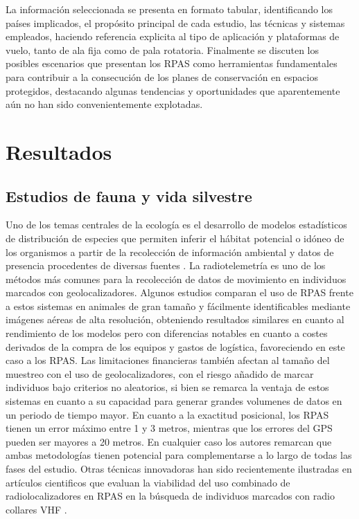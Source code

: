 \documentclass[twocolumn]{extarticle}
\begin{document}
La información seleccionada se presenta en formato tabular,
identificando los países implicados, el propósito principal de cada
estudio, las técnicas y sistemas empleados, haciendo referencia
explicita al tipo de aplicación y plataformas de vuelo, tanto de ala
fija como de pala rotatoria. Finalmente se discuten los posibles
escenarios que presentan los RPAS como herramientas fundamentales para
contribuir a la consecución de los planes de conservación en espacios
protegidos, destacando algunas tendencias y oportunidades que
aparentemente aún no han sido convenientemente explotadas.

\section{Resultados}\label{resultados}

\subsection{Estudios de fauna y vida
silvestre}\label{estudios-de-fauna-y-vida-silvestre}

Uno de los temas centrales de la ecología es el desarrollo de modelos
estadísticos de distribución de especies que permiten inferir el hábitat
potencial o idóneo de los organismos a partir de la recolección de
información ambiental y datos de presencia procedentes de diversas
fuentes \citep{Mateo2011}. La radiotelemetría es uno de los métodos más
comunes para la recolección de datos de movimiento en individuos
marcados con geolocalizadores. Algunos estudios comparan el uso de RPAS
frente a estos sistemas \citep{PazmanyMulero2015, Mulero-Pazmany2015} en
animales de gran tamaño y fácilmente identificables mediante imágenes
aéreas de alta resolución, obteniendo resultados similares en cuanto al
rendimiento de los modelos pero con diferencias notables en cuanto a
costes derivados de la compra de los equipos y gastos de logística,
favoreciendo en este caso a los RPAS. Las limitaciones financieras
también afectan al tamaño del muestreo con el uso de geolocalizadores,
con el riesgo añadido de marcar individuos bajo criterios no aleatorios,
si bien se remarca la ventaja de estos sistemas en cuanto a su capacidad
para generar grandes volumenes de datos en un periodo de tiempo mayor.
En cuanto a la exactitud posicional, los RPAS tienen un error máximo
entre 1 y 3 metros, mientras que los errores del GPS pueden ser mayores
a 20 metros. En cualquier caso los autores remarcan que ambas
metodologías tienen potencial para complementarse a lo largo de todas
las fases del estudio. Otras técnicas innovadoras han sido recientemente
ilustradas en artículos cientificos que evaluan la viabilidad del uso
combinado de radiolocalizadores en RPAS en la búsqueda de individuos
marcados con radio collares VHF
\citep{Korner2010, Bayram2016, Cliff2015, Leonardo2013}.
\end{document}
